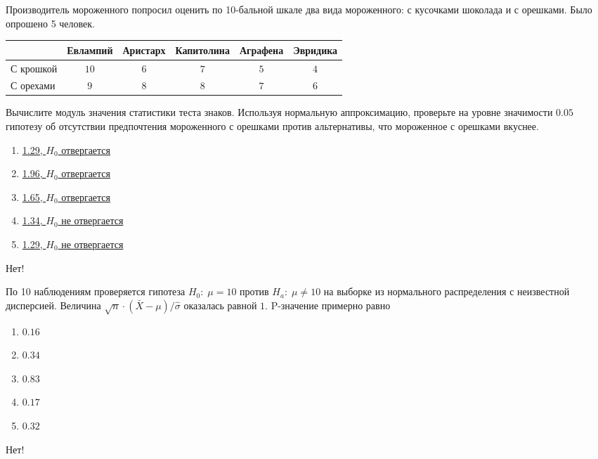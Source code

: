 \documentclass[t]{beamer}
\begin{document}
 \begin{frame} \label{31-No} 
\begin{block}{31} 
\small
 Производитель мороженного попросил оценить по 10-бальной шкале два вида мороженного: с кусочками шоколада и с орешками. Было опрошено 5 человек.


 \begin{tabular}{@{}lccccc@{}}
 \toprule
           & Евлампий & Аристарх & Капитолина & Аграфена & Эвридика \\ \midrule
 С крошкой & $10$     & $6$      & $7$        & $5$      & $4$      \\
 С орехами & $9$      & $8$      & $8$        & $7$      & $6$      \\ \bottomrule
 \end{tabular}


Вычислите модуль значения статистики теста знаков. Используя нормальную аппроксимацию, проверьте на уровне значимости $0.05$ гипотезу об отсутствии предпочтения мороженного с орешками против альтернативы, что мороженное с орешками вкуснее.
 


 \end{block} 
\begin{enumerate} 
\item[] \hyperlink{31-No}{\beamergotobutton{} 1.29, $H_0$ отвергается}
\item[] \hyperlink{31-No}{\beamergotobutton{} 1.96, $H_0$ отвергается}
\item[] \hyperlink{31-No}{\beamergotobutton{} 1.65, $H_0$ отвергается}
\item[] \hyperlink{31-Yes}{\beamergotobutton{} 1.34, $H_0$ не отвергается}
\item[] \hyperlink{31-No}{\beamergotobutton{} 1.29, $H_0$ не отвергается}
\end{enumerate} 

 \alert{Нет!} 
\end{frame} 


 \begin{frame} \label{32-No} 
\begin{block}{32} 

По 10 наблюдениям проверяется гипотеза $H_0: \; \mu=10$ против $H_a: \; \mu \neq 10$ на выборке из нормального распределения с неизвестной дисперсией. Величина $\sqrt{n}\cdot (\bar{X}-\mu)/\hat{\sigma}$ оказалась равной $1$. P-значение примерно равно
 


 \end{block} 
\begin{enumerate} 
\item[] \hyperlink{32-Yes}{\beamergotobutton{} $0.16$}
\item[] \hyperlink{32-No}{\beamergotobutton{} $0.34$}
\item[] \hyperlink{32-No}{\beamergotobutton{} $0.83$}
\item[] \hyperlink{32-No}{\beamergotobutton{} $0.17$}
\item[] \hyperlink{32-No}{\beamergotobutton{} $0.32$}
\end{enumerate} 

 \alert{Нет!} 
\end{frame} 
\end{document}
